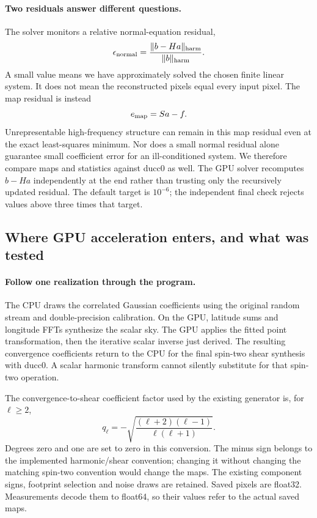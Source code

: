 \paragraph{Two residuals answer different questions.}
The solver monitors a relative normal-equation residual,
\begin{equation}
 \epsilon_{\rm normal}=
 \frac{\|b-Ha\|_{\rm harm}}{\|b\|_{\rm harm}}.
\end{equation}
A small value means we have approximately solved the chosen finite linear
system. It does not mean the reconstructed pixels equal every input pixel.
The map residual is instead
\begin{equation}
 e_{\rm map}=Sa-f.
\end{equation}
Unrepresentable high-frequency structure can remain in this map residual
even at the exact least-squares minimum. Nor does a small normal residual
alone guarantee small coefficient error for an ill-conditioned system.
We therefore compare maps and statistics against ducc0 as well. The GPU
solver recomputes $b-Ha$ independently at the end rather than trusting
only the recursively updated residual. The default target is $10^{-6}$;
the independent final check rejects values above three times that target.

\subsection{Where GPU acceleration enters, and what was tested}

\paragraph{Follow one realization through the program.}
The CPU draws the correlated Gaussian coefficients using the original
random stream and double-precision calibration. On the GPU, latitude sums
and longitude FFTs synthesize the scalar sky. The GPU applies the fitted
point transformation, then the iterative scalar inverse just derived.
The resulting convergence coefficients return to the CPU for the final
spin-two shear synthesis with ducc0. A scalar harmonic transform cannot
silently substitute for that spin-two operation.

The convergence-to-shear coefficient factor used by the existing generator
is, for $\ell\ge2$,
\begin{equation}
 q_\ell=-\sqrt{\frac{(\ell+2)(\ell-1)}{\ell(\ell+1)}}.
\end{equation}
Degrees zero and one are set to zero in this conversion. The minus sign
belongs to the implemented harmonic/shear convention; changing it without
changing the matching spin-two convention would change the maps. The
existing component signs, footprint selection and noise draws are retained.
Saved pixels are float32. Measurements decode them to float64, so their
values refer to the actual saved maps.

